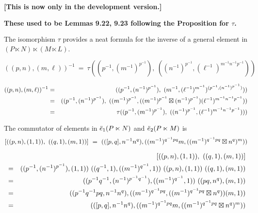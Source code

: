 
\newpage
\noindent
{\bf [This is now only in the development version.]}

{\bf These used to be Lemmas 9.22, 9.23 following the Proposition for $\tau$.} 

\bigskip
The isomorphism $\tau$ provides a neat formula for the inverse of a 
general element in $(P \ltimes N) \ltimes (M \ltimes L)$.
\begin{lem}
$$
((p,n),(m,\ell))^{-1} ~=~ 
\tau((p^{-1},(m^{-1})^{p^{-1}}),~ 
 ((n^{-1})^{p^{-1}},(\ell^{-1})^{m^{-1}n^{-1}p^{-1}}))
$$
\end{lem}
\begin{pf}
\begin{eqnarray*}
((p,n),(m,\ell))^{-1} 
 &=& ((p^{-1},(n^{-1})^{p^{-1}}),~
        (m^{-1},(\ell^{-1})^{m^{-1}})^{(p^{-1},(n^{-1})^{p^{-1}})})) \\
 &=& ((p^{-1},(n^{-1})^{p^{-1}}),~
        ((m^{-1})^{p^{-1}},
          ((m^{-1})^{p^{-1}} \boxtimes (n^{-1})^{p^{-1}}) 
           (\ell^{-1})^{m^{-1}n^{-1}p^{-1}})) \\
 &=& \tau((p^{-1},(m^{-1})^{p^{-1}}),~ 
          ((n^{-1})^{p^{-1}},(\ell^{-1})^{m^{-1}n^{-1}p^{-1}}))) 
\end{eqnarray*}
\end{pf}

\begin{lem}
The commutator of elements in $\ddot{e}_1(P \ltimes N)$ 
and $\ddot{e}_2(P \ltimes M)$ is 
$$
 [((p,n),(1,1)),~((q,1),(m,1))]
~=~
 (([p,q],n^{-1}n^q), 
      ((m^{-1})^{q^{-1}pq}m,((m^{-1})^{q^{-1}pq}\boxtimes n^q)^m))
$$
\end{lem}
\begin{pf}
\vspace*{-8mm}
\begin{eqnarray*}
 & & [((p,n),(1,1)),~((q,1),(m,1))] \\
 &=& ((p^{-1},(n^{-1})^{p^{-1}}),(1,1))~
     ((q^{-1},1),((m^{-1})^{q^{-1}},1))~ 
     ((p,n),(1,1))~
     ((q,1),(m,1)) \\
 &=& ((p^{-1}q^{-1},(n^{-1})^{p^{-1}q^{-1}}),((m^{-1})^{q^{-1}},1))~ 
     ((pq,n^q),(m,1)) \\
 &=& ((p^{-1}q^{-1}pq,n^{-1}n^q), 
      ((m^{-1})^{q^{-1}pq},((m^{-1})^{q^{-1}pq}\boxtimes n^q))(m,1)) \\
 &=& (([p,q],n^{-1}n^q), 
      ((m^{-1})^{q^{-1}pq}m,((m^{-1})^{q^{-1}pq}\boxtimes n^q)^m)) 
\end{eqnarray*}
\end{pf}



